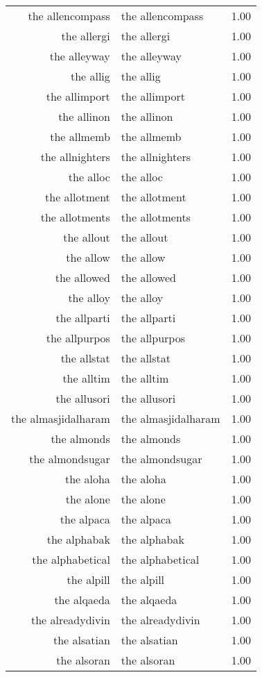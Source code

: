 \begin{table}[ht]
\begin{tabular}{rlr}
  the allencompass & the allencompass & 1.00 \\ 
  the allergi & the allergi & 1.00 \\ 
  the alleyway & the alleyway & 1.00 \\ 
  the allig & the allig & 1.00 \\ 
  the allimport & the allimport & 1.00 \\ 
  the allinon & the allinon & 1.00 \\ 
  the allmemb & the allmemb & 1.00 \\ 
  the allnighters & the allnighters & 1.00 \\ 
  the alloc & the alloc & 1.00 \\ 
  the allotment & the allotment & 1.00 \\ 
  the allotments & the allotments & 1.00 \\ 
  the allout & the allout & 1.00 \\ 
  the allow & the allow & 1.00 \\ 
  the allowed & the allowed & 1.00 \\ 
  the alloy & the alloy & 1.00 \\ 
  the allparti & the allparti & 1.00 \\ 
  the allpurpos & the allpurpos & 1.00 \\ 
  the allstat & the allstat & 1.00 \\ 
  the alltim & the alltim & 1.00 \\ 
  the allusori & the allusori & 1.00 \\ 
  the almasjidalharam & the almasjidalharam & 1.00 \\ 
  the almonds & the almonds & 1.00 \\ 
  the almondsugar & the almondsugar & 1.00 \\ 
  the aloha & the aloha & 1.00 \\ 
  the alone & the alone & 1.00 \\ 
  the alpaca & the alpaca & 1.00 \\ 
  the alphabak & the alphabak & 1.00 \\ 
  the alphabetical & the alphabetical & 1.00 \\ 
  the alpill & the alpill & 1.00 \\ 
  the alqaeda & the alqaeda & 1.00 \\ 
  the alreadydivin & the alreadydivin & 1.00 \\ 
  the alsatian & the alsatian & 1.00 \\ 
  the alsoran & the alsoran & 1.00 \\ 

\end{tabular}
\end{table}

